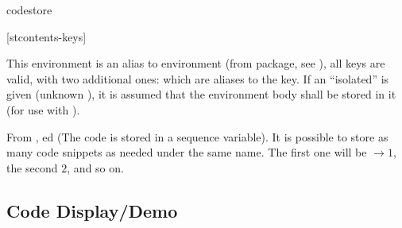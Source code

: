 \documentclass{article}
\begin{document}
\begin{codedescribe}[env,rulecolor=white]{codestore}
	\begin{codesyntax}
		\tsmacro{\begin{codestore}}[stcontents-keys]{}
    \tsmacro{\end{codestore}}{}
	\end{codesyntax}
This environment is an alias to  environment (from  package, see \cite{SCONTENTS}), all  keys are valid, with two additional ones:  which are aliases to the  key. If an ``isolated''  is given (unknown ), it is assumed that the environment body shall be stored in it (for use with \tsobj[code]{\tscode,\tsmergedcode,\tsdemo,\tsresult,\tsexec}).
\end{codedescribe}
\begin{tsremark}
  From ,  ed (The code is stored in a sequence variable). It is possible to store as many code snippets as needed under the same name. The first one will be $\rightarrow 1$, the second $2$, and so on.
\end{tsremark}


\subsection{Code Display/Demo}\label{codelist}
\end{document}
